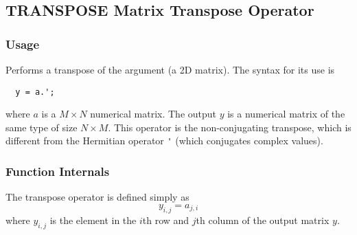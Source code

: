 %
%
%
\subsection{TRANSPOSE Matrix Transpose Operator}
\subsubsection{Usage}
Performs a transpose of the argument (a 2D matrix).  The syntax for its use is
\begin{verbatim}
  y = a.';
\end{verbatim}
where $a$ is a $M \times N$ numerical matrix.  The output $y$ is a numerical matrix
of the same type of size $N \times M$.  This operator is the non-conjugating transpose,
which is different from the Hermitian operator \verb|'| (which conjugates complex values).
\subsubsection{Function Internals}
The transpose operator is defined simply as
\[
  y_{i,j} = a_{j,i}
\]
where $y_{i,j}$ is the element in the $i$th row and $j$th column of the output matrix $y$.

